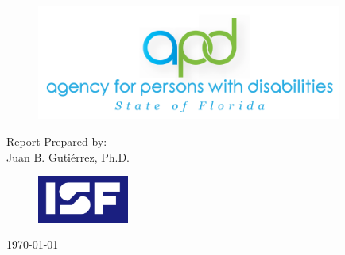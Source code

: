 \pagestyle{plain} %
\thispagestyle{empty}
\begin{center}
	{\large \textbf{\sc{\TheTitle}} } 




	\begin{figure}[th]
		\centering
		\includegraphics[width=10cm]{../assets/APD-logo-BG.png}
	\end{figure}

	\vspace{\fill}
	{\centering Report Prepared by:  
	\\ Juan B. Gutiérrez, Ph.D.
	}
	\vspace{\fill}

	\begin{figure}[th]
		\centering
		\includegraphics[width=3cm]{../assets/ISF-logo-medium.png}
	\end{figure}



	{\normalsize \today}


	

\end{center}

\newpage

\thispagestyle{empty}

